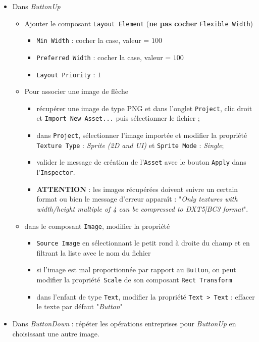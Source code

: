 \documentclass[a4paper,10pt]{article}
\newenvironment{solution}%
{\begin{tcolorbox}[breakable,colback=red!5!white,colframe=red!75!black,title=Solution]}%
{\end{tcolorbox}}
\begin{document}
\begin{solution}
\begin{itemize}
	\item Dans \textit{ButtonUp}
		\begin{itemize}
			\item Ajouter le composant  \texttt{Layout Element} (\textbf{ne pas cocher} \texttt{Flexible Width})
			\begin{itemize}
				\item \texttt{Min Width} : cocher la case, valeur = $100$
				\item \texttt{Preferred Width} : cocher la case, valeur = $100$
				\item \texttt{Layout Priority} : $1$
			\end{itemize}	
			\item Pour associer une image de flèche
			\begin{itemize}
				\item récupérer une image de type PNG et dans l'onglet \texttt{Project}, clic droit et \texttt{Import New Asset...} puis sélectionner le fichier ;
				\item dans \texttt{Project}, sélectionner l'image importée et modifier la propriété \texttt{Texture Type} : \textit{Sprite (2D and UI)} et \texttt{Sprite Mode} : \textit{Single};				
				\item valider le message de création de l'\texttt{Asset} avec le bouton \texttt{Apply} dans l'\texttt{Inspector}.
				\item \textbf{ATTENTION} : les images récupérées doivent suivre un certain format ou bien le message d'erreur apparaît : "\textit{Only textures with width/height multiple of 4 can be compressed to DXT5|BC3 format}".
			\end{itemize}	
			\item dans le composant \texttt{Image}, modifier la propriété
			\begin{itemize}
				\item \texttt{Source Image} en sélectionnant le petit rond à droite du champ et en filtrant la liste avec le nom du fichier
				\item si l'image est mal proportionnée par rapport au \texttt{Button}, on peut modifier la propriété\texttt{ Scale} de son composant \texttt{Rect Transform}
				\item dans l'enfant de type \texttt{Text}, modifier la propriété \texttt{Text > Text} : effacer le texte par défaut "\textit{Button}"
			\end{itemize}
		\end{itemize}	
	\item Dans \textit{ButtonDown} : répéter les opérations entreprises pour \textit{ButtonUp} en choisissant une autre image.
\end{itemize}


\end{solution}
\end{document}

